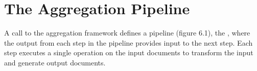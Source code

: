 \documentclass[letterpaper,10pt,english]{sphinxmanual}
\begin{document}
\begin{figure}[htbp]
\centering

\noindent{}
\end{figure}

\begin{figure}[htbp]
\centering

\noindent{}
\end{figure}


\section{The Aggregation Pipeline}
\label{\detokenize{04-mongo/04-02-pipelines:The-Aggregation-Pipeline}}\label{\detokenize{04-mongo/04-02-pipelines::doc}}
A call to the aggregation framework defines a pipeline (figure 6.1), the
, where the output from each step in the
pipeline provides input to the next step. Each step executes a single
operation on the input documents to transform the input and generate
output documents.

\begin{figure}[htbp]
\centering

\noindent{}
\end{figure}
\end{document}
